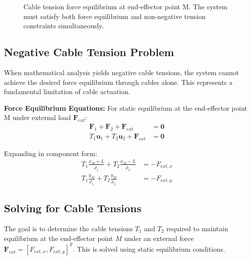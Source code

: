\begin{figure}[htbp]
\caption{Cable tension force equilibrium at end-effector point M. The system must satisfy both force equilibrium and non-negative tension constraints simultaneously.}
\label{fig:cable_tension_equilibrium}
\end{figure}

\subsection{Negative Cable Tension Problem}
When mathematical analysis yields negative cable tensions, the system cannot achieve the desired force equilibrium through cables alone. This represents a fundamental limitation of cable actuation.

\textbf{Force Equilibrium Equations:}
For static equilibrium at the end-effector point M under external load $\bm{F}_{ext}$:
\begin{align}
\bm{F}_1 + \bm{F}_2 + \bm{F}_{ext} &= \bm{0} \\
T_1 \bm{u}_1 + T_2 \bm{u}_2 + \bm{F}_{ext} &= \bm{0}
\end{align}

Expanding in component form:
\begin{align}
T_1 \frac{x_M + L}{\rho_1} + T_2 \frac{x_M - L}{\rho_2} &= -F_{ext,x} \\
T_1 \frac{y_M}{\rho_1} + T_2 \frac{y_M}{\rho_2} &= -F_{ext,y}
\end{align}

\subsection{Solving for Cable Tensions}

The goal is to determine the cable tensions $T_1$ and $T_2$ required to maintain equilibrium at the end-effector point $M$ under an external force $\bm{F}_{ext} = [F_{ext,x}, F_{ext,y}]^T$. This is solved using static equilibrium conditions.

